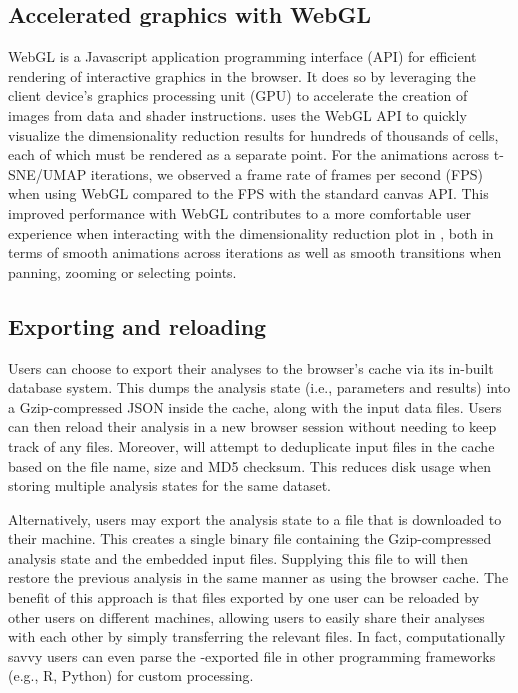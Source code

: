 \documentclass{article}
\begin{document}
\subsection{Accelerated graphics with WebGL}

WebGL is a Javascript application programming interface (API) for efficient rendering of interactive graphics in the browser.
It does so by leveraging the client device's graphics processing unit (GPU) to accelerate the creation of images from data and shader instructions.
 uses the WebGL API to quickly visualize the dimensionality reduction results for hundreds of thousands of cells, each of which must be rendered as a separate point.
For the animations across t-SNE/UMAP iterations, we observed a frame rate of  frames per second (FPS) when using WebGL 
compared to the  FPS with the standard canvas API.
This improved performance with WebGL contributes to a more comfortable user experience when interacting with the dimensionality reduction plot in ,
both in terms of smooth animations across iterations as well as smooth transitions when panning, zooming or selecting points.

\subsection{Exporting and reloading}

Users can choose to export their analyses to the browser's cache via its in-built  database system.
This dumps the analysis state (i.e., parameters and results) into a Gzip-compressed JSON inside the cache, along with the input data files.
Users can then reload their analysis in a new browser session without needing to keep track of any files.
Moreover,  will attempt to deduplicate input files in the cache based on the file name, size and MD5 checksum.
This reduces disk usage when storing multiple analysis states for the same dataset. 

Alternatively, users may export the analysis state to a file that is downloaded to their machine.
This creates a single binary file containing the Gzip-compressed analysis state and the embedded input files.
Supplying this file to  will then restore the previous analysis in the same manner as using the browser cache.
The benefit of this approach is that files exported by one user can be reloaded by other users on different machines,
allowing users to easily share their analyses with each other by simply transferring the relevant files.
In fact, computationally savvy users can even parse the -exported file in other programming frameworks (e.g., R, Python) for custom processing.
\end{document}
